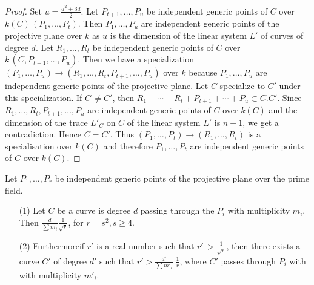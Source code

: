 \begin{proof}  
 Set $u = \frac{d^{2}+3d}{2} $. Let $ P_{t+1} ,\ldots , P_{u} $ be
 independent generic points of $C$ over $k(C) \, (P_1, \ldots,
 P_t)$. Then $P_{1}, \ldots , P_{u} $ are independent generic
 points of the projective plane over $k$ as $u$ is the dimension of
 the linear system $L'$ of curves of degree $d$. Let $R_{1}, \ldots ,
 R_{t}$ be independent generic points of $C$ over $k \, (C,
 P_{t+1}, \ldots , P_{u})$. Then we have a specialization 
$(P_{1}, \ldots ,P_{u}) \rightarrow (R_{1} , \ldots , R_{t} ,
 P_{t+1}, \ldots , P_{u}) $ over $k$ because $P_{1} , \ldots ,
 P_{u} $ are independent generic points of the projective plane. Let
 $C$ specialize to $C'$ under this specialization. If $C  \, \neq C'$,
  then $R_1 +\cdots + R_t + P_{t+1}+ \cdots +P_u \subset C.C'$.
 Since $ R_1, \ldots , R_t , P_{t+1}, \ldots , P_u $ are independent
 generic points of $C$ over $k(C)$ and the dimension of the trace 
$L'_{C} $ on $C$ of the linear system $L'$ is $n-1$, we get a
 contradiction. Hence $C = C'$. Thus $(P_{1}, \ldots , P_{t})
 \rightarrow(R_{1}, \ldots , R_{t}) $ is a specialisation over $k(C)$
 and therefore $P_1, \ldots , P_t $ are independent generic points
 of $C$ over $k(C)$. 
\end{proof}

\setcounter{proposition}{0}
\begin{proposition}\label{chap3:sec1:prop1}%
 Let $P_{1}, \ldots , P_{r} $ be independent generic points of the
 projective plane over the prime field.
\begin{itemize}
\item[{\rm (1)}] Let $C$ be a curve is
 degree $d$ passing through the $P_i $ with multiplicity 
$m_{i}$. Then $\frac{d}{\sum m_{i}} \frac{1}{\sqrt{r}}$, for $r =s^{2}, s \geq 4$. 

\item[{\rm (2)}] Furthermore\pageoriginale if $r'$ is a real number
  such that $r'\, >  \frac{1}{\sqrt{r}}$, then there exists a
  curve $C'$ of degree $d'$ such that $r'  >  \frac{d'}{\sum
    m'_{i}} \; \frac{1}{r}$, where $C'$ passes through $P_{i}$ with with
  multiplicity $m'_{i}$.   
\end{itemize}
\end{proposition}

